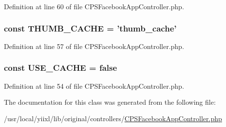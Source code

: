 Definition at line 60 of file CPSFacebookAppController.php.

\hypertarget{classCPSFacebookAppController_a68a34ece4de56a54f4f82c474c0204d7}{
\subsubsection[{THUMB\_\-CACHE}]{\setlength{\rightskip}{0pt plus 5cm}const {\bf THUMB\_\-CACHE} = 'thumb\_\-cache'}}
\label{classCPSFacebookAppController_a68a34ece4de56a54f4f82c474c0204d7}


Definition at line 57 of file CPSFacebookAppController.php.

\hypertarget{classCPSFacebookAppController_aa59dac68626789b109ad0c18e6fbb96e}{
\subsubsection[{USE\_\-CACHE}]{\setlength{\rightskip}{0pt plus 5cm}const {\bf USE\_\-CACHE} = false}}
\label{classCPSFacebookAppController_aa59dac68626789b109ad0c18e6fbb96e}


Definition at line 54 of file CPSFacebookAppController.php.



The documentation for this class was generated from the following file:\begin{DoxyCompactItemize}
\item 
/usr/local/yiixl/lib/original/controllers/\hyperlink{CPSFacebookAppController_8php}{CPSFacebookAppController.php}\end{DoxyCompactItemize}
